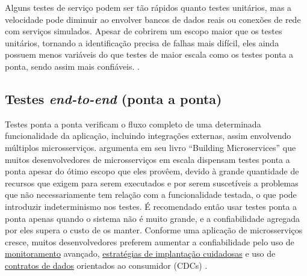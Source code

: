 Alguns testes de serviço podem ser tão rápidos quanto testes unitários, mas a velocidade pode diminuir ao envolver bancos de dados reais ou conexões de rede com serviços simulados. Apesar de cobrirem um escopo maior que os testes unitários, tornando a identificação precisa de falhas mais difícil, eles ainda possuem menos variáveis do que testes de maior escala como os testes ponta a ponta, sendo assim mais confiáveis. \cite{livro-building-microservices}.

\subsection{Testes \emph{end-to-end} (ponta a ponta)}\label{subsecao-testes-endtoend}
Testes ponta a ponta verificam o fluxo completo de uma determinada funcionalidade da aplicação, incluindo integrações externas, assim envolvendo múltiplos microsserviços.  argumenta em seu livro “Building Microservices” que muitos desenvolvedores de microsserviços em escala dispensam testes ponta a ponta apesar do ótimo escopo que eles provêem, devido à grande quantidade de recursos que exigem para serem executados e por serem suscetíveis a problemas que não necessariamente tem relação com a funcionalidade testada, o que pode introduzir indeterminismo nos testes. É recomendado então usar testes ponta a ponta apenas quando o sistema não é muito grande, e a confiabilidade agregada por eles supera o custo de os manter. Conforme uma aplicação de microsserviços cresce, muitos desenvolvedores preferem aumentar a confiabilidade pelo uso de \hyperref[observabilidade-monitoramento]{monitoramento} avançado, \hyperref[estrategias-implantacao]{estratégias de implantação cuidadosas} e uso de \hyperref[subsecao-contratos-de-dados]{contratos de dados} orientados ao consumidor (CDCs) 
\cite{livro-building-microservices}.


